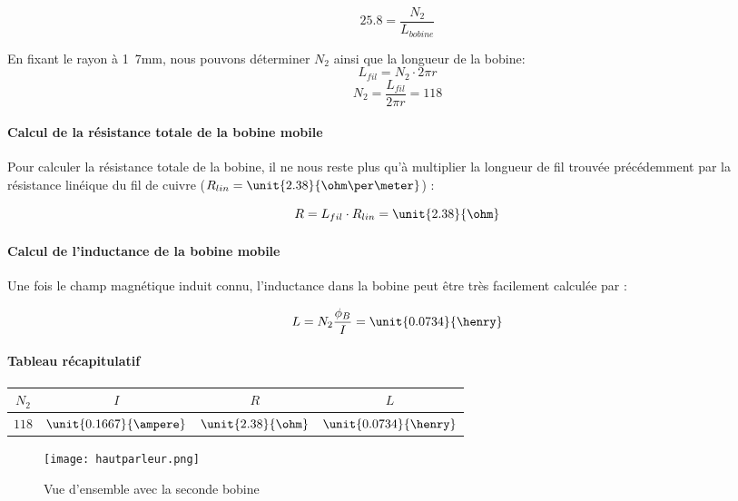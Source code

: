$$25.8 = \frac{N_2}{L_{bobine}}$$

En fixant le rayon à \unit{1.7}{mm}, nous pouvons déterminer $N_2$ ainsi que la longueur de la bobine:
$$L_{fil} = N_2 \cdot 2\pi r$$ 
$$N_2 =  \frac{L_{fil}}{2\pi r} = 118$$


\paragraph{Calcul de la résistance totale de la bobine mobile}
Pour calculer la résistance totale de la bobine, il ne nous reste plus qu'à multiplier la longueur de fil trouvée 
précédemment par la résistance linéique du fil de cuivre
($R_{lin} = \unit{2.38}{\ohm\per\meter}$) :

$$R = L_{fil} \cdot R_{lin} = \unit{2.38}{\ohm}$$

\paragraph{Calcul de l'inductance de la bobine mobile}

Une fois le champ magnétique induit connu, l'inductance dans la bobine peut être très facilement calculée par :

$$L = N_2 \frac{\phi_B}{I} = \unit{0.0734}{\henry}$$

\paragraph{Tableau récapitulatif}

\begin{center}
	\begin{tabular}{c|c|c|c}
		$N_2$ & $I$ & $R$ & $L$ \\
		\hline
		 $118$ & $\unit{0.1667}{\ampere}$ & $\unit{2.38}{\ohm}$ & $\unit{0.0734}{\henry}$ \\
	\end{tabular}
\end{center}

\begin{figure}[ht!]
\centering
\texttt{[image: hautparleur.png]}
\caption{Vue d'ensemble avec la seconde bobine}
\label{Vue d'ensemble avec la seconde bobine}
\end{figure}


